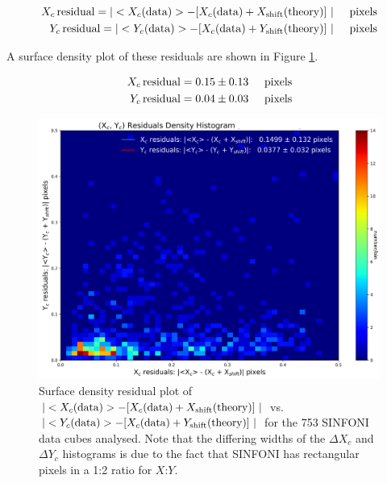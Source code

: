 \begin{align}
X_c \, {\rm residual}    =    |  <X_c ({\rm data})>  -  [X_c ({\rm data})  +  X_{\rm shift} ({\rm theory})]\  |  \hspace*{0.5cm} {\rm pixels}  \\
Y_c \, {\rm residual}    =    |  <Y_c ({\rm data})>  -  [X_c ({\rm data})  +  Y_{\rm shift} ({\rm theory})]\  |  \hspace*{0.5cm} {\rm pixels}
\end{align}

A surface density plot of these residuals are shown in Figure \ref{fig:residual_density}.  

\begin{align}
X_c \, {\rm residual}    =    0.15 \pm 0.13  \hspace*{0.5cm} {\rm pixels}  \\
Y_c \, {\rm residual}    =    0.04 \pm 0.03  \hspace*{0.5cm} {\rm pixels}
\end{align}

\begin{figure}[H]
\centering \subfigure
\includegraphics[width=16cm]{figures/SINFO_DAR_2014_2015_2016_residual_density.png} 
\caption[]
	{\footnotesize  Surface density residual plot of $|  <X_c ({\rm data})>  -  [X_c ({\rm data})  +  X_{\rm shift} ({\rm theory})]\  |$ vs. 
	$|  <Y_c ({\rm data})>  -  [X_c ({\rm data})  +  Y_{\rm shift} ({\rm theory})]\  |$ for the 753 SINFONI data
	cubes analysed.  Note that the differing widths of the $\Delta X_c$ and $\Delta Y_c$ histograms is due to the fact that SINFONI has rectangular pixels
	in a 1:2 ratio for $X$:$Y$.
	}
	\label{fig:residual_density}
\end{figure}

